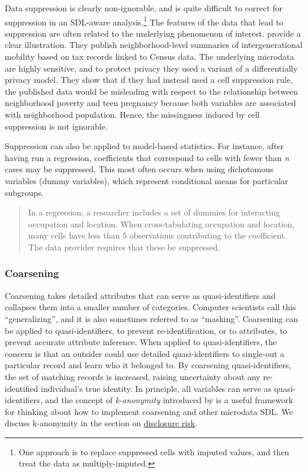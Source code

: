 \documentclass[
]{WileySix}
\begin{document}
Data suppression is clearly non-ignorable, and is quite difficult to correct for suppression in an SDL-aware analysis.\footnote{One approach is to replace suppressed cells with imputed values, and then treat the data as multiply-imputed.} The features of the data that lead to suppression are often related to the underlying phenomenon of interest. \citet{chetty_practical_2019} provide a clear illustration. They publish neighborhood-level summaries of intergenerational mobility based on tax records linked to Census data. The underlying microdata are highly sensitive, and to protect privacy they used a variant of a differentially privacy model. They show that if they had instead used a cell suppression rule, the published data would be misleading with respect to the relationship between neighborhood poverty and teen pregnancy because both variables are associated with neighborhood population. Hence, the missingness induced by cell suppression is not ignorable.

Suppression can also be applied to model-based statistics. For instance, after having run a regression, coefficients that correspond to cells with fewer than \emph{n} cases may be suppressed. This most often occurs when using dichotomous variables (dummy variables), which represent conditional means for particular subgroups.

\begin{quote}
In a regression, a researcher includes a set of dummies for interacting occupation and location. When cross-tabulating occupation and location, many cells have less than 5 observations contributing to the coefficient. The data provider requires that these be suppressed.
\end{quote}

\hypertarget{coarsening}{%
\subsubsection{Coarsening}\label{coarsening}}

Coarsening takes detailed attributes that can serve as quasi-identifiers and collapses them into a smaller number of categories. Computer scientists call this ``generalizing'', and it is also sometimes referred to as ``masking''. Coarsening can be applied to quasi-identifiers, to prevent re-identification, or to attributes, to prevent accurate attribute inference. When applied to quasi-identifiers, the concern is that an outsider could use detailed quasi-identifiers to single-out a particular record and learn who it belonged to. By coarsening quasi-identifiers, the set of matching records is increased, raising uncertainty about any re-identified individual's true identity. In principle, all variables can serve as quasi-identifiers, and the concept of \emph{k-anonymity} introduced by \citet{sweeney_achieving_2002} is a useful framework for thinking about how to implement coarsening and other microdata SDL. We discuss k-anonymity in the section on \protect\hyperlink{disclosure-risk}{disclosure risk}.
\end{document}
